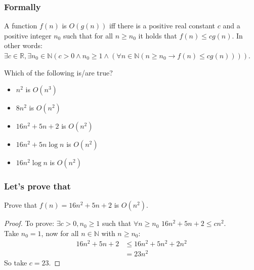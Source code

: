\begin{frame}
	\frametitle{Formally}
	\begin{definition}[Big-Oh]
		A function $f(n)$ is $O(g(n))$ iff there is a positive real constant $c$ and a positive integer $n_0$ such that for
		all $n \geq n_0$ it holds that $f(n) \leq c g(n)$. In other words:\\
		$\exists c \in \mathbb{R}, \exists n_0 \in \mathbb{N} (c > 0 \wedge n_0 \geq 1 \wedge (\forall n \in \mathbb{N} (n
		\geq n_0 \to f(n) \leq cg(n))))$.
	\end{definition}
	
		Which of the following is/are true?
		\begin{itemize}
			\item $n^2$ is $O(n^3)$
			\item $8n^2$ is $O(n^2)$
			\item $16n^2 + 5n + 2$ is $O(n^2)$
			\item $16n^2 + 5n \log n$ is $O(n^2)$
			\item $16n^2\log n$ is $O(n^2)$
		\end{itemize}
\end{frame}

\begin{frame}
	\frametitle{Let's prove that}

		Prove that $f(n) = 16n^2 + 5n + 2$ is $O(n^2)$.
	
	\begin{proof}
		To prove: $\exists c > 0, n_0 \geq 1$ such that $\forall n \geq n_0$ $16n^2 + 5n + 2 \leq cn^2$.\\
		
		Take $n_0 = 1$, now for all $n \in \mathbb{N}$ with $n \geq n_0$:
		\begin{align*}
			16n^2 + 5n + 2 &\leq 16n^2 + 5n^2 + 2n^2 \\
										 &= 23n^2
		\end{align*}
		So take $c=23$.
	\end{proof}
\end{frame}


